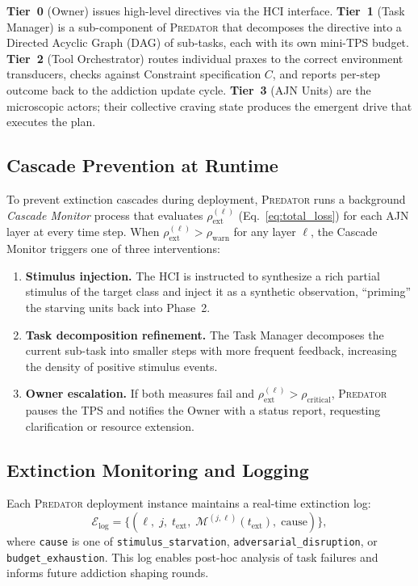\documentclass[12pt,a4paper]{article}
\newcommand{\PREDATOR}{\textsc{Predator}}
\begin{document}
\textbf{Tier~0} (Owner) issues high-level directives via the HCI interface.
\textbf{Tier~1} (Task Manager) is a sub-component of \PREDATOR{} that
decomposes the directive into a Directed Acyclic Graph (DAG) of sub-tasks,
each with its own mini-TPS budget.
\textbf{Tier~2} (Tool Orchestrator) routes individual praxes to the correct
environment transducers, checks against Constraint specification $C$, and
reports per-step outcome back to the addiction update cycle.
\textbf{Tier~3} (AJN Units) are the microscopic actors; their collective
craving state produces the emergent drive that executes the plan.

\subsection{Cascade Prevention at Runtime}

To prevent extinction cascades during deployment, \PREDATOR{} runs a
background \textit{Cascade Monitor} process that evaluates
$\rho_{\text{ext}}^{(\ell)}$ (Eq.~\eqref{eq:total_loss}) for each AJN layer
at every time step. When $\rho_{\text{ext}}^{(\ell)} > \rho_{\text{warn}}$
for any layer $\ell$, the Cascade Monitor triggers one of three interventions:

\begin{enumerate}
  \item \textbf{Stimulus injection.} The HCI is instructed to synthesize a
    rich partial stimulus of the target class and inject it as a synthetic
    observation, ``priming'' the starving units back into Phase~2.
  \item \textbf{Task decomposition refinement.} The Task Manager decomposes
    the current sub-task into smaller steps with more frequent feedback,
    increasing the density of positive stimulus events.
  \item \textbf{Owner escalation.} If both measures fail and
    $\rho_{\text{ext}}^{(\ell)} > \rho_{\text{critical}}$, \PREDATOR{}
    pauses the TPS and notifies the Owner with a status report, requesting
    clarification or resource extension.
\end{enumerate}

\subsection{Extinction Monitoring and Logging}

Each \PREDATOR{} deployment instance maintains a real-time extinction log:
\[
  \mathcal{E}_{\text{log}} = \bigl\{(\ell,\; j,\; t_{\text{ext}},\;
  \mathcal{M}^{(j,\ell)}(t_{\text{ext}}),\; \text{cause}) \bigr\},
\]
where \texttt{cause} is one of \texttt{stimulus\_starvation},
\texttt{adversarial\_disruption}, or \texttt{budget\_exhaustion}. This log
enables post-hoc analysis of task failures and informs future addiction
shaping rounds.
\end{document}
